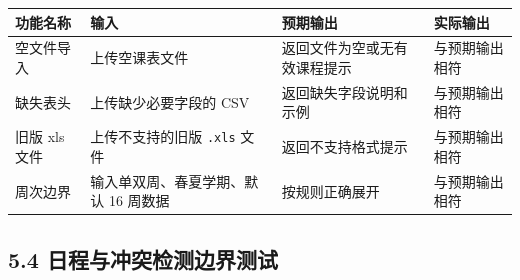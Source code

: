 {\def\LTcaptype{none} %
\begin{longtable}[]{@{}|
  >{\raggedright\arraybackslash}p{}|
  >{\raggedright\arraybackslash}p{}|
  >{\raggedright\arraybackslash}p{}|
  >{\raggedright\arraybackslash}p{}|@{}}
\hline
\rowcolor{gray!12}
\begin{minipage}[b]{\linewidth}\raggedright
\bfseries 功能名称
\end{minipage} & \begin{minipage}[b]{\linewidth}\raggedright
\bfseries 输入
\end{minipage} & \begin{minipage}[b]{\linewidth}\raggedright
\bfseries 预期输出
\end{minipage} & \begin{minipage}[b]{\linewidth}\raggedright
\bfseries 实际输出
\end{minipage} \\
\hline
\endhead
\hline
\endlastfoot
空文件导入 & 上传空课表文件 & 返回文件为空或无有效课程提示 &
与预期输出相符 \\
\hline
缺失表头 & 上传缺少必要字段的 CSV & 返回缺失字段说明和示例 &
与预期输出相符 \\
\hline
旧版 xls 文件 & 上传不支持的旧版 \passthrough{\lstinline!.xls!} 文件 &
返回不支持格式提示 & 与预期输出相符 \\
\hline
周次边界 & 输入单双周、春夏学期、默认 16 周数据 & 按规则正确展开 &
与预期输出相符 \\
\hline
\end{longtable}
}

\subsection{5.4
日程与冲突检测边界测试}\label{ux65e5ux7a0bux4e0eux51b2ux7a81ux68c0ux6d4bux8fb9ux754cux6d4bux8bd5}

